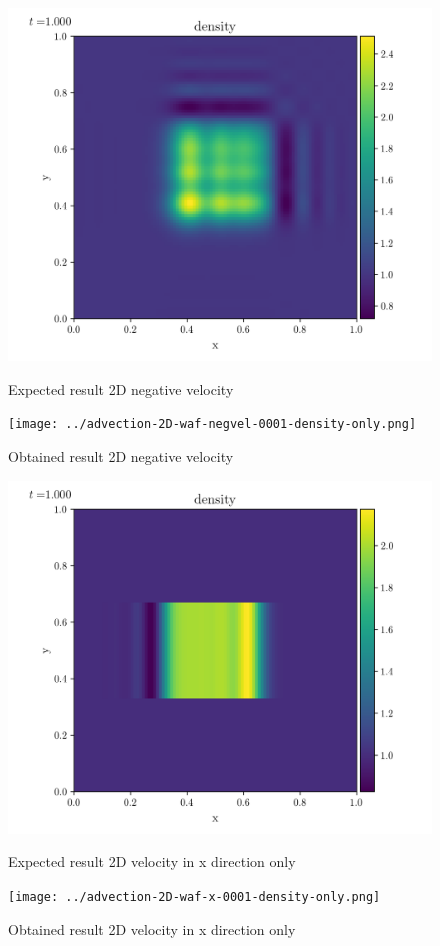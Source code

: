     \begin{figure}[htbp]
        \centering
        \includegraphics[width=.7\textwidth]{./figures/advection-2D-waf-negvel-0001-density-only.png}%
        \caption{Expected result 2D negative velocity}
        \texttt{[image: ../advection-2D-waf-negvel-0001-density-only.png]}%
        \caption{Obtained result 2D negative velocity}
    \end{figure}

    \begin{figure}[htbp]
        \centering
        \includegraphics[width=.7\textwidth]{./figures/advection-2D-waf-x-0001-density-only.png}%
        \caption{Expected result 2D velocity in x direction only}
        \texttt{[image: ../advection-2D-waf-x-0001-density-only.png]}%
        \caption{Obtained result 2D velocity in x direction only}
    \end{figure}

